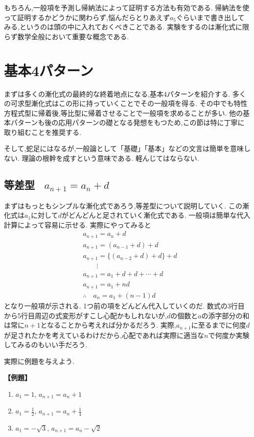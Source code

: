 \documentclass[dvipdfmx,a4paper,11pt,fleqn,openany]{jsbook}
\begin{document}
    もちろん,一般項を予測し帰納法によって証明する方法も有効である.
    帰納法を使って証明するかどうかに関わらず,悩んだらとりあえず$a_5$ぐらいまで書き出してみる,というのは頭の中に入れておくべきことである.
    実験をするのは漸化式に限らず数学全般において重要な概念である.
  \section{基本4パターン}
    まずは多くの漸化式の最終的な終着地点になる,基本4パターンを紹介する.
    多くの可求型漸化式はこの形に持っていくことでその一般項を得る.
    その中でも特性方程式型に帰着後,等比型に帰着させることで一般項を求めることが多い.
    他の基本パターンも後の応用パターンの礎となる発想をもつため,この節は特に丁寧に取り組むことを推奨する.
    
    そして,蛇足にはなるが,一般論として「基礎」「基本」などの文言は簡単を意味しない.
    理論の根幹を成すという意味である.
    軽んじてはならない.

    \subsection{等差型 \, $a_{n+1}=a_n+d$}
      まずはもっともシンプルな漸化式であろう,等差型について説明していく.
      この漸化式は$a_1$に対して$d$がどんどんと足されていく漸化式である.
      一般項は簡単な代入計算によって容易に示せる.
      実際にやってみると
      \begin{align*}
        &a_{n+1}=a_n+d\\
        &a_{n+1}=(a_{n-1}+d)+d\\
        &a_{n+1}=\{(a_{n-2}+d)+d\}+d\\
        &\qquad \vdots\\
        &a_{n+1}=a_1+d+d+\cdots+d\\
        &a_{n+1}=a_1+nd\\
        &\therefore \quad a_n=a_1+(n-1)d
      \end{align*}
      となり一般項が示される.
      1つ前の項をどんどん代入していくのだ.
      数式の3行目から5行目周辺の式変形がすこし心配かもしれないが,$d$の個数と$a$の添字部分の和は常に$n+1$となることから考えれば分かるだろう.
      実際,$a_{n+1}$に至るまでに何度$d$が足されたかを考えているわけだから,心配であれば実際に適当な$n$で何度か実験してみるのもいい手だろう.

      実際に例題を与えよう.

      \noindent \textbf{【例題】}
      \begin{enumerate}[label=(\arabic*),parsep=3pt]
        \item $\displaystyle a_1=1,\, a_{n+1}=a_n+1$
        \item $\displaystyle a_1=\frac{1}{2},\, a_{n+1}=a_n+\frac{1}{4}$
        \item $\displaystyle a_1=-\sqrt{3},\, a_{n+1}=a_n-\sqrt{2}$
      \end{enumerate}
\end{document}
